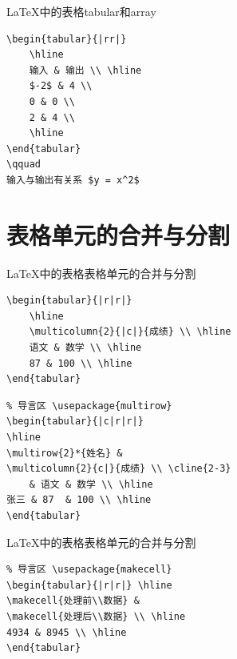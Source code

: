 \documentclass[11pt]{beamer}
\begin{document}
\begin{frame}[fragile]{\LaTeX 中的表格}{tabular和array}
\begin{lstlisting}
\begin{tabular}{|rr|}
	\hline
	输入 & 输出 \\ \hline
	$-2$ & 4 \\
	0 & 0 \\
	2 & 4 \\
	\hline
\end{tabular}
\qquad
输入与输出有关系 $y = x^2$
\end{lstlisting}
\end{frame}

\section{表格单元的合并与分割}

\begin{frame}[fragile]{\LaTeX 中的表格}{表格单元的合并与分割}
\begin{lstlisting}
\begin{tabular}{|r|r|}
	\hline
	\multicolumn{2}{|c|}{成绩} \\ \hline
	语文 & 数学 \\ \hline
	87 & 100 \\ \hline
\end{tabular}
\end{lstlisting}
\begin{lstlisting}
% 导言区 \usepackage{multirow}
\begin{tabular}{|c|r|r|}
\hline
\multirow{2}*{姓名} &
\multicolumn{2}{c|}{成绩} \\ \cline{2-3}
	& 语文 & 数学 \\ \hline
张三 & 87  & 100 \\ \hline
\end{tabular}
\end{lstlisting}
\end{frame}

\begin{frame}[fragile]{\LaTeX 中的表格}{表格单元的合并与分割}
\begin{lstlisting}
% 导言区 \usepackage{makecell}
\begin{tabular}{|r|r|} \hline
\makecell{处理前\\数据} &
\makecell{处理后\\数据} \\ \hline
4934 & 8945 \\ \hline
\end{tabular}
\end{lstlisting}
\end{frame}
\end{document}
